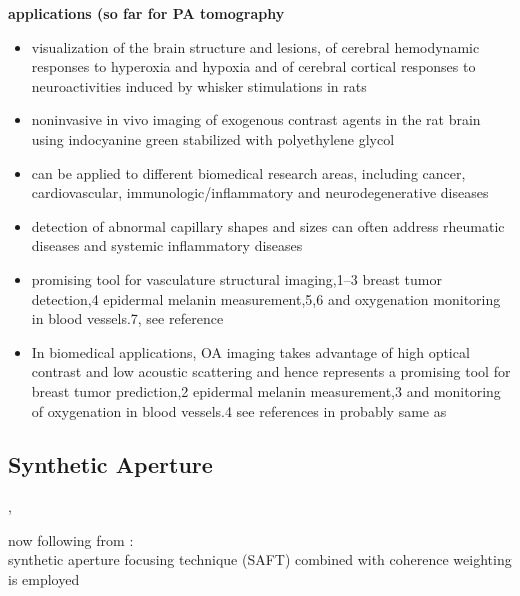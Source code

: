 \textbf{applications (so far for PA tomography}
\begin{itemize}
	\item visualization of the brain structure and lesions, of cerebral hemodynamic responses to hyperoxia and hypoxia and of cerebral cortical responses to neuroactivities induced by whisker stimulations in rats \cite{2003_Wang_Noninvasivelaserinduced}
	\item noninvasive in vivo imaging of exogenous contrast agents in the rat brain using indocyanine green stabilized with polyethylene glycol \cite{2004_Wang_Noninvasivephotoacousticangiography} 
	\item can be applied to different biomedical research areas, including cancer, cardiovascular, immunologic/inflammatory and neurodegenerative diseases
	\item detection of abnormal capillary shapes and sizes can often address rheumatic diseases and systemic inflammatory diseases \cite{2001_ScusselLonzetti_UpdatingAmericanCollege,2006_Cutolo_Nailfoldcapillaroscopyis}
	\item promising tool for vasculature structural imaging,1–3 breast tumor detection,4 epidermal melanin measurement,5,6 and oxygenation monitoring in blood vessels.7, see reference \cite{2006_Li_Improvedinvivo}
	\item In biomedical applications, OA imaging takes advantage of high optical contrast and low acoustic scattering and hence represents a promising tool for breast tumor prediction,2 epidermal melanin measurement,3 and monitoring of oxygenation in blood vessels.4 see references in  \cite{2004_Liao_Optoacousticimagingwith} probably same as \cite{2006_Li_Improvedinvivo}
\end{itemize}

\subsection{Synthetic Aperture}
\label{sec:SyntheticAperture} 


\cite{2012_Ma_Fastscanningcoaxial},

now following from \cite{2004_Liao_Optoacousticimagingwith}:\\
synthetic aperture focusing technique (SAFT) combined with coherence weighting is employed

